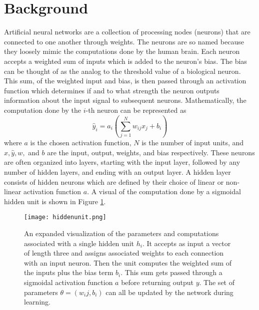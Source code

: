 \documentclass[12pt]{article}
\begin{document}
\section{Background}
\indent Artificial neural networks are a collection of processing nodes (neurons) that are connected to one another through weights. The neurons are so named because they loosely mimic the computations done by the human brain. Each neuron accepts a weighted sum of inputs which is added to the neuron's bias. The bias can be thought of as the analog to the threshold value of a biological neuron. This sum, of the weighted input and bias, is then passed through an activation function which determines if and to what strength the neuron outputs information about the input signal to subsequent neurons. Mathematically, the computation done by the $i$-th neuron can be represented as
\begin{equation}
  \hat y_i = a_i(\sum_{j=1}^N w_{ij}x_j + b_i)
  \label{eq:unit}
\end{equation}
where $a$ is the chosen activation function, $N$ is the number of input units, and $x,\hat y,w,$ and $b$ are the input, output, weights, and bias respectively. These neurons are often organized into layers, starting with the input layer, followed by any number of hidden layers, and ending with an output layer. A hidden layer consists of hidden neurons which are defined by their choice of linear or non-linear activation function $a$. A visual of the computation done by a sigmoidal hidden unit is shown in Figure \ref{fig:hiddenunit}.  \\
\begin{figure}
  \centering
  \texttt{[image: hiddenunit.png]}
  \caption{An expanded visualization of the parameters and computations associated with a single hidden unit $h_i$. It accepts as input a vector of length three and assigns associated weights to each connection with an input neuron. Then the unit computes the weighted sum of the inputs plus the bias term $b_i$. This sum gets passed through a sigmoidal activation function $a$ before returning output $y$. The set of parameters $\theta = (w_ij,b_i)$ can all be updated by the network during learning.}
  \label{fig:hiddenunit}
\end{figure}
\end{document}
